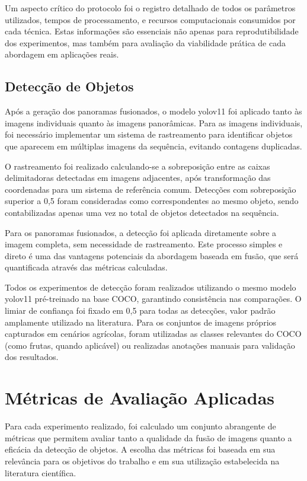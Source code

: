 Um aspecto crítico do protocolo foi o registro detalhado de todos os parâmetros utilizados, tempos de processamento, e recursos computacionais consumidos por cada técnica. Estas informações são essenciais não apenas para reprodutibilidade dos experimentos, mas também para avaliação da viabilidade prática de cada abordagem em aplicações reais.

\subsection{Detecção de Objetos}

Após a geração dos panoramas fusionados, o modelo \gls{yolo}v11 foi aplicado tanto às imagens individuais quanto às imagens panorâmicas. Para as imagens individuais, foi necessário implementar um sistema de rastreamento para identificar objetos que aparecem em múltiplas imagens da sequência, evitando contagens duplicadas.

O rastreamento foi realizado calculando-se a sobreposição entre as caixas delimitadoras detectadas em imagens adjacentes, após transformação das coordenadas para um sistema de referência comum. Detecções com sobreposição superior a 0,5 foram consideradas como correspondentes ao mesmo objeto, sendo contabilizadas apenas uma vez no total de objetos detectados na sequência.

Para os panoramas fusionados, a detecção foi aplicada diretamente sobre a imagem completa, sem necessidade de rastreamento. Este processo simples e direto é uma das vantagens potenciais da abordagem baseada em fusão, que será quantificada através das métricas calculadas.

Todos os experimentos de detecção foram realizados utilizando o mesmo modelo \gls{yolo}v11 pré-treinado na base COCO, garantindo consistência nas comparações. O limiar de confiança foi fixado em 0,5 para todas as detecções, valor padrão amplamente utilizado na literatura. Para os conjuntos de imagens próprios capturados em cenários agrícolas, foram utilizadas as classes relevantes do COCO (como frutas, quando aplicável) ou realizadas anotações manuais para validação dos resultados.

\section{Métricas de Avaliação Aplicadas}

Para cada experimento realizado, foi calculado um conjunto abrangente de métricas que permitem avaliar tanto a qualidade da fusão de imagens quanto a eficácia da detecção de objetos. A escolha das métricas foi baseada em sua relevância para os objetivos do trabalho e em sua utilização estabelecida na literatura científica.

